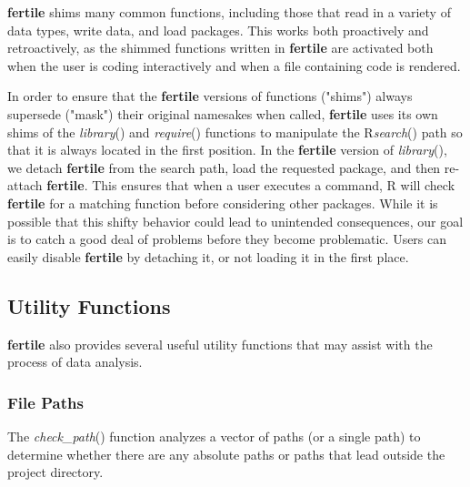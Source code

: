 \documentclass[APA,LATO1COL]{WileyNJD-v2}\usepackage[]{graphicx}\usepackage[]{color}
\newcommand{\R}{\textsf{R}\xspace}
\newcommand{\pkg}[1]{\textbf{#1}}
\newcommand{\func}[1]{\textit{#1}()}
\begin{document}
\pkg{fertile} shims many common functions, including those that read in a variety of data types, write data, and load packages. This works both proactively and retroactively, as the shimmed functions written in \pkg{fertile} are activated both when the user is coding interactively and when a file containing code is rendered.

In order to ensure that the \pkg{fertile} versions of functions ("shims") always supersede ("mask") their original namesakes when called, \pkg{fertile} uses its own shims of the \func{library} and \func{require} functions to  manipulate the \R \func{search} path so that it is always located in the first position. In the \pkg{fertile} version of \func{library}, we detach \pkg{fertile} from the search path, load the requested package, and then re-attach \pkg{fertile}. This ensures that when a user executes a command, \R will check \pkg{fertile} for a matching function before considering other packages. While it is possible that this shifty behavior could lead to unintended consequences, our goal is to catch a good deal of problems before they become problematic. Users can easily disable \pkg{fertile} by detaching it, or not loading it in the first place. 


\subsection{Utility Functions}

\pkg{fertile} also provides several useful utility functions that may assist with the process of data analysis. 

\subsubsection{File Paths}

The \func{check\_path} function analyzes a vector of paths (or a single path) to determine whether there are any absolute paths or paths that lead outside the project directory.
\end{document}
